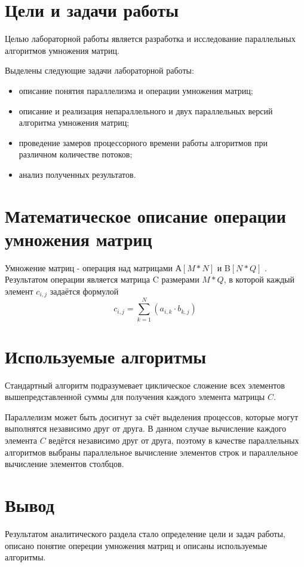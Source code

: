 \section{Цели и задачи работы}
Целью лабораторной работы является разработка и исследование параллельных алгоритмов умножения матриц.

Выделены следующие задачи лабораторной работы:

\begin{itemize}
\item описание понятия параллелизма и операции умножения матриц;
\item описание и реализация непараллельного и двух параллельных версий алгоритма умножения матриц;
\item проведение замеров процессорного времени работы алгоритмов при различном количестве потоков;
\item анализ полученных результатов.
\end{itemize}

\section{Математическое описание операции умножения матриц}
Умножение матриц - операция над матрицами А$[M*N] $ и B$[N*Q]$ \cite{mul_def}. Результатом операции является матрица C размерами $ M*Q $, в которой каждый элемент $c_{i,j}$ задаётся формулой
\begin{equation} 
	c_{i,j} = \sum_{k=1}^{N}(a_{i,k} \cdot b_{k,j})
\end{equation}


\section{Используемые алгоритмы}
Стандартный алгоритм подразумевает циклическое сложение всех элементов вышепредставленной суммы для получения каждого элемента матрицы $C$.

Параллелизм может быть досигнут за счёт выделения процессов, которые могут выполнятся независимо друг от друга. В данном случае вычисление каждого элемента $C$ ведётся независимо друг от друга, поэтому в качестве параллельных алгоритмов выбраны параллельное вычисление элементов строк и параллельное вычисление элементов столбцов.

\section*{Вывод}
Результатом аналитического раздела стало определение цели и задач работы, описано понятие опереции умножения матриц и описаны используемые алгоритмы.